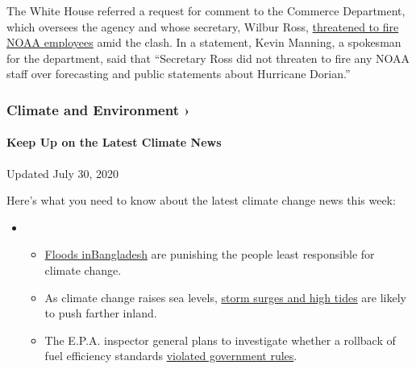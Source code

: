 The White House referred a request for comment to the Commerce
Department, which oversees the agency and whose secretary, Wilbur Ross,
\href{https://www.nytimes3xbfgragh.onion/2019/09/09/climate/hurricane-dorian-trump-tweet.html?rref=collection\%2Fbyline\%2Fchristopher-flavelle\&action=click\&contentCollection=undefined\&region=stream\&module=stream_unit\&version=latest\&contentPlacement=6\&pgtype=collection}{threatened
to fire NOAA employees} amid the clash. In a statement, Kevin Manning, a
spokesman for the department, said that ``Secretary Ross did not
threaten to fire any NOAA staff over forecasting and public statements
about Hurricane Dorian.''

\href{https://www.nytimes3xbfgragh.onion/section/climate?action=click\&pgtype=Article\&state=default\&region=MAIN_CONTENT_1\&context=storylines_keepup}{}

\hypertarget{climate-and-environment-}{%
\subsubsection{Climate and Environment
›}\label{climate-and-environment-}}

\hypertarget{keep-up-on-the-latest-climate-news}{%
\paragraph{Keep Up on the Latest Climate
News}\label{keep-up-on-the-latest-climate-news}}

Updated July 30, 2020

Here's what you need to know about the latest climate change news this
week:

\begin{itemize}
\item
  \begin{itemize}
  \tightlist
  \item
    \href{https://www.nytimes3xbfgragh.onion/2020/07/30/climate/bangladesh-floods.html?action=click\&pgtype=Article\&state=default\&region=MAIN_CONTENT_1\&context=storylines_keepup}{Floods
    in}\href{https://www.nytimes3xbfgragh.onion/2020/07/30/climate/bangladesh-floods.html?action=click\&pgtype=Article\&state=default\&region=MAIN_CONTENT_1\&context=storylines_keepup}{Bangladesh}
    are punishing the people least responsible for climate change.
  \item
    As climate change raises sea levels,
    \href{https://www.nytimes3xbfgragh.onion/2020/07/30/climate/sea-level-inland-floods.html?action=click\&pgtype=Article\&state=default\&region=MAIN_CONTENT_1\&context=storylines_keepup}{storm
    surges and high tides} are likely to push farther inland.
  \item
    The E.P.A. inspector general plans to investigate whether a rollback
    of fuel efficiency standards
    \href{https://www.nytimes3xbfgragh.onion/2020/07/27/climate/trump-fuel-efficiency-rule.html?action=click\&pgtype=Article\&state=default\&region=MAIN_CONTENT_1\&context=storylines_keepup}{violated
    government rules}.
  \end{itemize}
\end{itemize}

